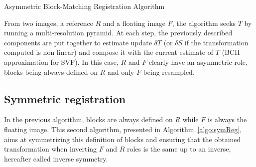 \begin{algorithm}[!htbp]
\caption{Asymmetric Block-Matching Registration Algorithm}
\label{algo:asymReg}
\begin{algorithmic}[1]
    \ENDFOR
  \ENDFOR
\end{algorithmic}
\end{algorithm}
From two images, a reference $R$ and a floating image $F$, the algorithm seeks $T$ by running a multi-resolution pyramid. At each step, the previously described components are put together to estimate update $\delta T$ (or $\delta S$ if the transformation computed is non linear) and compose it with the current estimate of $T$ (\ac{BCH} approximation for \ac{SVF}). In this case, $R$ and $F$ clearly have an asymmetric role, blocks being always defined on $R$ and only $F$ being resampled.


\subsection{Symmetric registration} %
\label{sub:symmetric_registration}

In the previous algorithm, blocks are always defined on $R$ while $F$ is always the floating image. This second algorithm, presented in Algorithm~\ref{algo:symReg}, aims at symmetrizing this definition of blocks and ensuring that the obtained transformation when inverting $F$ and $R$ roles is the same up to an inverse, hereafter called inverse symmetry.

